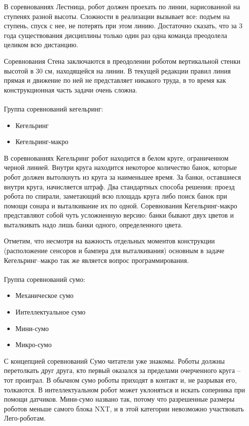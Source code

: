 В соревнованиях Лестница, робот должен проехать по линии, нарисованной на ступенях разной высоты.  Сложности в реализации вызывает все: подъем на ступень, спуск с нее, не потерять при этом линию. Достаточно сказать, что за 3 года существования дисциплины только один раз одна команда преодолела целиком всю дистанцию. 

Соревнования Стена заключаются в преодолении роботом вертикальной стенки высотой в 30 см, находящейся на линии. В текущей редакции правил линия прямая и движение по ней не представляет никакого труда, в то время как конструкционная часть задачи очень сложна.\\\\

Группа соревнований кегельринг:

\begin{itemize}
	\item Кегельринг
	\item Кегельринг-макро
\end{itemize}

В соревнованиях Кегельринг робот находится в белом круге, ограниченном черной  линией. Внутри круга находится некоторое количество банок, которые робот должен вытолкнуть из круга за наименьшее время. За банки, оставшиеся внутри круга, начисляется штраф. Два стандартных способа решения: проезд робота по спирали, заметающий всю площадь круга либо поиск банок при помощи сонара и выталкивание их по одной. Соревнования Кегельринг-макро представляют собой чуть усложненную версию: банки бывают двух цветов и выталкивать надо лишь банки одного, определенного цвета. 

Отметим, что несмотря на важность отдельных моментов конструкции (расположение сенсоров и бампера для выталкивания) основным в задаче Кегельринг–макро так же является вопрос программирования.\\\\

Группа соревнований сумо:

\begin{itemize}
	\item Механическое сумо
	\item Интеллектуальное сумо
	\item Мини-сумо
	\item Микро-сумо
\end{itemize}

С концепцией соревнований Сумо читатели уже знакомы. Роботы должны перетолкать друг друга, кто первый оказался за пределами очерченного круга – тот проиграл. В обычном сумо роботы приходят в контакт и, не разрывая его, толкаются. В интеллектуальном робот может уклоняться и искать соперника при помощи датчиков. Мини-сумо названо так, потому что разрешенные размеры роботов меньше самого блока NXT, и в этой категории невозможно участвовать Лего-роботам.

